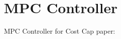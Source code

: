 \documentclass[../main.tex]{subfiles}
\begin{document}
	\chapter{MPC Controller}
	
	
	
	\begin{section} {MPC Controller for Cost Cap}
		paper: \cite{yang2019bid}
	\end{section}
	
\end{document}
